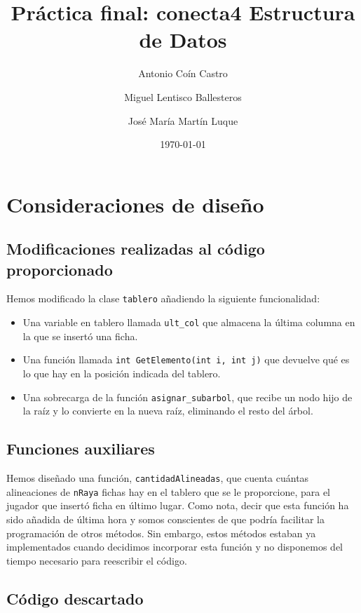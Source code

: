 \documentclass[11pt]{article}
\author{Antonio Coín Castro \and Miguel Lentisco Ballesteros \and José María Martín Luque}
\date{\today}
\title{Práctica final: conecta4 \linebreak Estructura de Datos}
\begin{document}
\maketitle
\tableofcontents



\section{Consideraciones de diseño}
\label{sec-1}

\subsection{Modificaciones realizadas al código proporcionado}
\label{sec-1-1}

Hemos modificado la clase \texttt{tablero} añadiendo la siguiente funcionalidad:

\begin{itemize}
\item Una variable en tablero llamada \texttt{ult\_col} que almacena la última columna en la
que se insertó una ficha.
\item Una función llamada \texttt{int GetElemento(int i, int j)} que devuelve qué es lo
que hay en la posición indicada del tablero.
\item Una sobrecarga de la función \texttt{asignar\_subarbol}, que recibe un nodo hijo de la raíz y lo
convierte en la nueva raíz, eliminando el resto del árbol.
\end{itemize}

\subsection{Funciones auxiliares}
\label{sec-1-2}

Hemos diseñado una función, \texttt{cantidadAlineadas}, que cuenta cuántas alineaciones
de \texttt{nRaya} fichas hay en el tablero que se le proporcione, para el jugador que insertó ficha en último lugar. Como nota, decir que esta función ha sido añadida de
última hora y somos conscientes de que podría facilitar la programación de otros
métodos. Sin embargo, estos métodos estaban ya implementados cuando decidimos
incorporar esta función y no disponemos del tiempo necesario para reescribir el código.

\subsection{Código descartado}
\label{sec-1-3}
\end{document}

